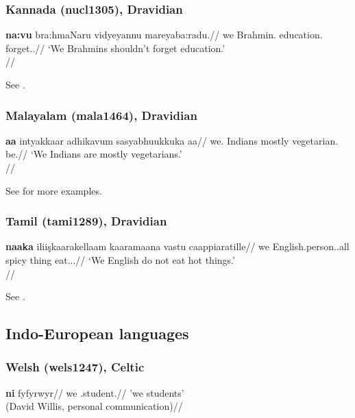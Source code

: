 \documentclass[A4paper]{article}
\begin{document}
\subsubsection{Kannada (nucl1305), Dravidian}

\ex \begingl
\gla \textbf{na:vu} bra:hmaNaru vidyeyannu mareyaba:radu.//
\glb we Brahmin.\Pl{} education.\Acc{} forget.\Inf.\Proh//
\glft `We Brahmins shouldn't forget education.'\\\citep[209, (755)]{sridhar1990}//
\endgl
\xe

See \citet[205, 208f.]{sridhar1990}.

\subsubsection{Malayalam (mala1464), Dravidian}

\ex \begingl
\gla \textbf{\textltailn{}a\ng\ng{}a\textrtaill{}} intyakkaar adhikavum sasyabhuukkuka\textrtaill{} aa\textrtailn{}\textschwa{}//
\glb we.\Excl{} Indians mostly vegetarian.\Pl{} be.\Prs{}//
\glft `We Indians are mostly vegetarians.'\\\citep[262, (1340)]{asherkumari1997}//
\endgl
\xe 

See  \citealp[262f.]{asherkumari1997} for more examples.

\subsubsection{Tamil (tami1289), Dravidian}

\ex \begingl
\gla \textbf{naa\ng{}ka} i\ng{}lii\c{s}kaara\ng{}kellaam kaaramaana vastu caappi\textrtailt{}aratille//
\glb we English.person.\Pl.all spicy thing eat.\Prs.\Nom{}.\Neg//
\glft `We English do not eat hot things.'\\\citep[146]{asher1985}//
\endgl
\xe 

See \citet[142, 146]{asher1985}.

\subsection{Indo-European languages}


\subsubsection{Welsh (wels1247), Celtic}

\ex \begingl
\gla \textbf{ni} fyfyrwyr//
\glb we \Softmut.student.\Pl{}//
\glft 'we students'\\(David Willis, personal communication)//
\endgl
\xe
\end{document}

